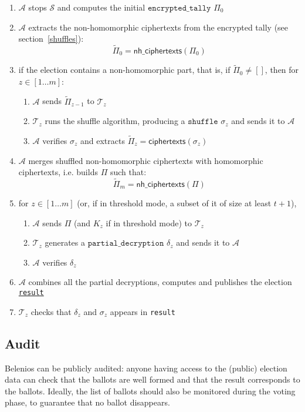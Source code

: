 \documentclass[a4paper]{article}
\newcommand{\etally}{\texttt{encrypted\_tally}}
\newcommand{\pdecryption}{\texttt{partial\_decryption}}
\newcommand{\result}{\texttt{result}}
\begin{document}
\begin{enumerate}
\item $\mathcal{A}$ stops $\mathcal{S}$ and computes the initial
  \hyperref[tally]{$\etally$} $\Pi_0$
\item $\mathcal{A}$ extracts the non-homomorphic ciphertexts from the
  encrypted tally (see
  section~\ref{shuffles}):
  \[\tilde\Pi_0=\textsf{nh\_ciphertexts}(\Pi_0)\]
\item if the election contains a non-homomorphic part, that is, if
  $\tilde\Pi_0\neq []$,
 then for $z\in[1\dots m]$:
  \begin{enumerate}
  \item $\mathcal{A}$ sends $\tilde\Pi_{z-1}$ to $\mathcal{T}_z$
  \item $\mathcal{T}_z$ runs the shuffle algorithm, producing a
    \hyperref[shuffles]{$\texttt{shuffle}$} $\sigma_z$ and sends it to
    $\mathcal{A}$
  \item $\mathcal{A}$ verifies $\sigma_z$ and extracts
    $\tilde\Pi_z=\textsf{ciphertexts}(\sigma_z)$
  \end{enumerate}
\item $\mathcal{A}$ merges shuffled non-homomorphic ciphertexts with
  homomorphic ciphertexts, i.e. builds $\Pi$ such
  that:\[\tilde\Pi_m=\textsf{nh\_ciphertexts}(\Pi)\]
\item for $z\in[1\dots m]$ (or, if in threshold mode, a subset of it
  of size at least $t+1$),
  \begin{enumerate}
  \item $\mathcal{A}$ sends $\Pi$ (and $K_z$ if in threshold mode) to
    $\mathcal{T}_z$
  \item $\mathcal{T}_z$ generates a \hyperref[tally]{$\pdecryption$} $\delta_z$
    and sends it to $\mathcal{A}$
  \item $\mathcal{A}$ verifies $\delta_z$
  \end{enumerate}
\item $\mathcal{A}$ combines all the partial decryptions, computes and publishes
  the election \hyperref[election-result]{\result}
\item $\mathcal{T}_z$ checks that $\delta_z$ and $\sigma_z$ appears in
  {\result}
\end{enumerate}

\subsection{Audit}

Belenios can be publicly audited: anyone having access to the (public)
election data can check that the ballots are well formed and that the
result corresponds to the ballots. Ideally, the list of ballots should
also be monitored during the voting phase, to guarantee that no ballot
disappears.
\end{document}
